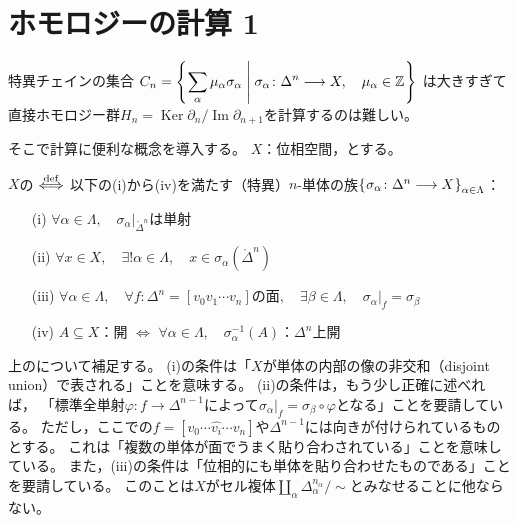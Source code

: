 \documentclass[uplatex]{jsarticle}
\renewcommand{\restriction}[2]{\left. #1 \right|_{#2}}
\DeclareMathOperator{\Image}{Im}
\DeclareMathOperator{\Kernel}{Ker}
\begin{document}
\fi

\section{ホモロジーの計算 1}


特異チェインの集合
${\displaystyle C_{n} = \Set{\hspace{-1.8pt}  \sum_{\alpha} \mu_{\alpha} \sigma_{\alpha} | \sigma_{\alpha} \colon \Delta^{n} \longrightarrow X, \quad \mu_{\alpha} \in \mathbb{Z} \hspace{-1.8pt}}}$
は大きすぎて直接ホモロジー群$H_{n} = \Kernel \partial_{n} / \Image \partial_{n+1}$を計算するのは難しい。

そこで計算に便利な概念を導入する。
$X$：位相空間，とする。

\begin{teigi}
	\label{homcalc.complex}
	$X$の $\overset{\mathrm{def}}{\Longleftrightarrow}$ 以下の(i)から(iv)を満たす（特異）$n$-単体の族$\Set{\hspace{-1.8pt} \sigma_{\alpha} \colon \Delta^{n} \longrightarrow X \hspace{-1.8pt}}_{\alpha \in \Lambda}$：
	\begin{enumerate}
		\vspace{-0.5\baselineskip}
		\item[(i)] $\forall \alpha \in \Lambda, \quad \restriction{\sigma_{\alpha}}{\mathring{\Delta}^{n}}$は単射
		\item[(ii)] $\forall x \in X, \quad \exists! \alpha \in \Lambda, \quad x \in \sigma_{\alpha} (\mathring{\Delta}^{n})$
		\item[(iii)] $\forall \alpha \in \Lambda, \quad \forall f : \Delta^{n} = [v_{0}v_{1}\cdots v_{n}]$の面$, \quad \exists \beta \in \Lambda, \quad \restriction{\sigma_{\alpha}}{f} = \sigma_{\beta}$
		\item[(iv)] $A \subseteq X$：開 $\Longleftrightarrow$ $\forall \alpha \in \Lambda, \quad \sigma_{\alpha}^{-1} (A)$：$\Delta^{n}$上開
	\end{enumerate}
\end{teigi}

上のについて補足する。
(i)の条件は「$X$が単体の内部の像の非交和（disjoint union）で表される」ことを意味する。
(ii)の条件は，もう少し正確に述べれば，
「標準全単射$\varphi \colon f \longrightarrow \Delta^{n-1}$によって$\restriction{\sigma_{\alpha}}{f} = \sigma_{\beta} \circ \varphi$となる」ことを要請している。
ただし，ここでの$f = [v_{0} \cdots \hat{v_{i}} \cdots v_{n}]$や$\Delta^{n-1}$には向きが付けられているものとする。
これは「複数の単体が面でうまく貼り合わされている」ことを意味している。
また，(iii)の条件は「位相的にも単体を貼り合わせたものである」ことを要請している。
このことは$X$がセル複体${\displaystyle \coprod_{\alpha} \Delta_{\alpha}^{n_{\alpha}} / \sim}$とみなせることに他ならない。
\end{document}
